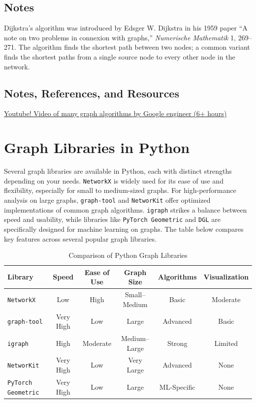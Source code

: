 \fi

\subsection{Notes}

Dijkstra's algorithm was introduced by Edsger W. Dijkstra in his 1959 paper ``A note on two problems in connexion with graphs,'' \textit{Numerische Mathematik} 1, 269--271. The algorithm finds the shortest path between two nodes; a common variant finds the shortest paths from a single source node to every other node in the network.

\subsection*{Notes, References, and Resources}
\begin{resource}
\href{https://www.youtube.com/watch?v=09_LlHjoEiY}{Youtube!  Video of many graph algorithms by Google engineer (6+ hours)}
\end{resource}

\section*{Graph Libraries in Python}

Several graph libraries are available in Python, each with distinct strengths depending on your needs. \texttt{NetworkX} is widely used for its ease of use and flexibility, especially for small to medium-sized graphs. For high-performance analysis on large graphs, \texttt{graph-tool} and \texttt{NetworKit} offer optimized implementations of common graph algorithms. \texttt{igraph} strikes a balance between speed and usability, while libraries like \texttt{PyTorch Geometric} and \texttt{DGL} are specifically designed for machine learning on graphs. The table below compares key features across several popular graph libraries.

\begin{table}[h!]
\centering
\begin{tabular}{@{}lccccc@{}}
\toprule
\textbf{Library} & \textbf{Speed} & \textbf{Ease of Use} & \textbf{Graph Size} & \textbf{Algorithms} & \textbf{Visualization} \\
\midrule
\texttt{NetworkX} & Low & High & Small–Medium & Basic & Moderate \\
\texttt{graph-tool} & Very High & Low & Large & Advanced & Basic \\
\texttt{igraph} & High & Moderate & Medium–Large & Strong & Limited \\
\texttt{NetworKit} & Very High & Low & Very Large & Advanced & None \\
\texttt{PyTorch Geometric} & Very High & Low & Large & ML-Specific & None \\
\bottomrule
\end{tabular}
\caption{Comparison of Python Graph Libraries}
\end{table}